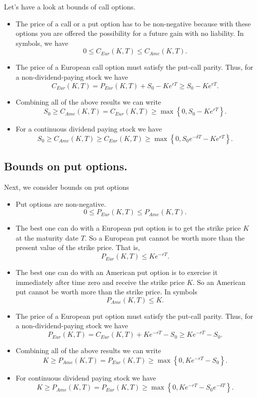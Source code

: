 \documentclass{book}
\begin{document}
Let's have a look at bounds of call options.
\begin{itemize}
\item The price of a call or a put option has to be non-negative because with
these options you are offered the possibility for a future gain with no liability.
In symbols, we have
$$
 0\leq C_{Eur}(K,T)\leq C_{Ame}(K,T).
$$
\item The price of a European call option must satisfy the put-call parity. Thus,
for a non-dividend-paying stock we have
$$
C_{Eur}(K,T)= P_{Eur}(K,T)+S_{0}-Ke^{rT}\geq S_{0}-Ke^{rT}. 
$$
\item Combining all of the above results we can write
$$
S_{0}\geq C_{Ame}(K,T)= C_{Eur}(K,T)\geq\max\left\{0,S_{0}-Ke^{rT}\right\}.
$$
\item For a continuous dividend paying stock we have
$$
S_{0}\geq C_{Ame}(K,T)\geq C_{Eur}(K,T)\geq\max\left\{0,S_{0}e^{-\delta T}-Ke^{rT}\right\}.
$$
\end{itemize}
\subsection{Bounds on put options.}
Next, we consider bounds on put options
\begin{itemize}
\item Put options are non-negative.
$$
0\leq P_{Eur}(K,T)\leq P_{Ame}(K,T).
$$
\item The best one can do with a European put option is to get the strike price
$K$ at the maturity date $T$. So a European put cannot be worth more than
the present value of the strike price. That is,
$$P_{Eur}(K,T)\leq Ke^{-rT}.$$
\item The best one can do with an American put option is to exercise it immediately
after time zero and receive the strike price $K$. So an American put
cannot be worth more than the strike price. In symbols
$$P_{Ame}(K,T)\leq K.$$
\item The price of a European put option must satisfy the put-call parity. Thus,
for a non-dividend-paying stock we have
$$
P_{Eur}(K,T)= C_{Eur}(K,T)+Ke^{-rT}-S_{0}\geq Ke^{-rT}-S_{0}. 
$$
\item Combining all of the above results we can write
$$
K\geq P_{Ame}(K,T)= P_{Eur}(K,T)\geq\max\left\{0,Ke^{-rT}-S_{0}\right\}.
$$ 
\item For continuous dividend paying stock we have
$$
K\geq P_{Ame}(K,T)= P_{Eur}(K,T)\geq\max\left\{0,Ke^{-rT}-S_{0}e^{-\delta T}\right\}.
$$ 
\end{itemize}
\end{document}
